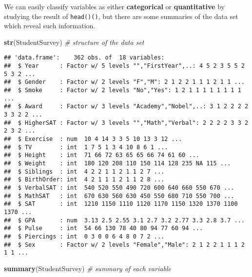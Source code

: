 \documentclass[]{book}
\newenvironment{Shaded}{\begin{snugshade}}{\end{snugshade}}
\newcommand{\CommentTok}[1]{\textcolor[rgb]{0.56,0.35,0.01}{\textit{#1}}}
\newcommand{\KeywordTok}[1]{\textcolor[rgb]{0.13,0.29,0.53}{\textbf{#1}}}
\newcommand{\NormalTok}[1]{#1}
\begin{document}
We can easily classify variables as either \textbf{categorical} or \textbf{quantitative} by studying the result of \texttt{head()()}, but there are some summaries of the data set which reveal such information.

\begin{Shaded}
\begin{Highlighting}[]
\KeywordTok{str}\NormalTok{(StudentSurvey)     }\CommentTok{# structure of the data set}
\end{Highlighting}
\end{Shaded}

\begin{verbatim}
## 'data.frame':    362 obs. of  18 variables:
##  $ Year      : Factor w/ 5 levels "","FirstYear",..: 4 5 2 3 5 5 2 5 3 2 ...
##  $ Gender    : Factor w/ 2 levels "F","M": 2 1 2 2 1 1 1 2 1 1 ...
##  $ Smoke     : Factor w/ 2 levels "No","Yes": 1 2 1 1 1 1 1 1 1 1 ...
##  $ Award     : Factor w/ 3 levels "Academy","Nobel",..: 3 1 2 2 2 2 3 3 2 2 ...
##  $ HigherSAT : Factor w/ 3 levels "","Math","Verbal": 2 2 2 2 3 3 2 2 3 2 ...
##  $ Exercise  : num  10 4 14 3 3 5 10 13 3 12 ...
##  $ TV        : int  1 7 5 1 3 4 10 8 6 1 ...
##  $ Height    : int  71 66 72 63 65 65 66 74 61 60 ...
##  $ Weight    : int  180 120 208 110 150 114 128 235 NA 115 ...
##  $ Siblings  : int  4 2 2 1 1 2 1 1 2 7 ...
##  $ BirthOrder: int  4 2 1 1 1 2 1 1 2 8 ...
##  $ VerbalSAT : int  540 520 550 490 720 600 640 660 550 670 ...
##  $ MathSAT   : int  670 630 560 630 450 550 680 710 550 700 ...
##  $ SAT       : int  1210 1150 1110 1120 1170 1150 1320 1370 1100 1370 ...
##  $ GPA       : num  3.13 2.5 2.55 3.1 2.7 3.2 2.77 3.3 2.8 3.7 ...
##  $ Pulse     : int  54 66 130 78 40 80 94 77 60 94 ...
##  $ Piercings : int  0 3 0 0 6 4 8 0 7 2 ...
##  $ Sex       : Factor w/ 2 levels "Female","Male": 2 1 2 2 1 1 1 2 1 1 ...
\end{verbatim}

\begin{Shaded}
\begin{Highlighting}[]
\KeywordTok{summary}\NormalTok{(StudentSurvey) }\CommentTok{# summary of each variable}
\end{Highlighting}
\end{Shaded}
\end{document}
